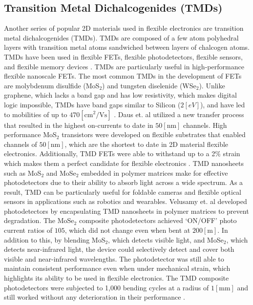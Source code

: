 \documentclass[conference]{IEEEtran}
\begin{document}
\subsection{Transition Metal Dichalcogenides (TMDs)}

Another series of popular 2D materials used in flexible electronics are transition metal dichalcogenides (TMDs). TMDs are composed of a few atom polyhedral layers with transition metal atoms sandwiched between layers of chalcogen atoms. TMDs have been used in flexible FETs, flexible photodetectors, flexible sensors, and flexible memory devices \cite{tc1}. TMDs are particularly useful in high-performance flexible nanoscale FETs. The most common TMDs in the development of FETs are molybdenum disulfide (MoS$_2$) and tungsten diselenide (WSe$_2$). Unlike graphene, which lacks a band gap and has low resistivity, which  makes digital logic impossible, TMDs have band gaps similar to Silicon ($2[\si{eV}]$), and have led to mobilities of up to $470[\si{\centi\meter\squared\per\volt\second}]$ \cite{tc8}. Daus et. al \cite{tc8} utilized a new transfer process that resulted in the highest on-currents to date in $50[\si{\nano\meter}]$ channels. High performance MoS$_2$ transistors were developed on flexible substrates that enabled channels of $50[\si{\nano\meter}]$, which are the shortest to date in 2D material flexible electronics. Additionally, TMD FETs were able to withstand up to a 2\% strain which makes them a perfect candidate for flexible electronics \cite{tc8}. TMD nanosheets such as MoS$_2$ and MoSe$_2$ embedded in polymer matrices make for effective photodetectors due to their ability to absorb light across a wide spectrum. As a result, TMD can be particularly useful for foldable cameras and flexible optical sensors in applications such as robotics and wearables.  Velusamy et. al \cite{tc9} developed photodetectors by encapsulating TMD nanosheets in polymer matrices to prevent degradation. The MoSe$_2$ composite photodetectors achieved `\textsc{ON/OFF}' photo current ratios of $105$, which did not change even when bent at $200[\si{\meter}]$. In addition to this, by blending MoS$_2$, which detects visible light, and MoSe$_2$, which detects near-infrared light, the device could selectively detect and cover both visible and near-infrared wavelengths. The photodetector was still able to maintain consistent performance even when under mechanical strain, which highlights its ability to be used in flexible electronics. The TMD composite photodetectors were subjected to 1,000 bending cycles at a radius of $1[\si{\milli\meter}]$ and still worked without any deterioration in their performance \cite{tc9}.
\end{document}
